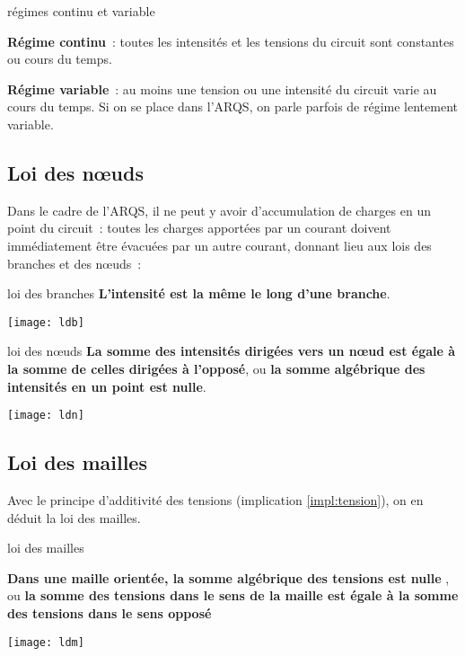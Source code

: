 \documentclass[../main/main.tex]{subfiles}
\begin{document}
\begin{defi}[label=def:regimecontvar, sidebyside]{régimes continu et variable}

    \textbf{Régime continu}~: toutes les intensités et les tensions du circuit
    sont constantes ou cours du temps.

    \tcblower

    \textbf{Régime variable}~: au moins une tension ou une intensité du circuit
    varie au cours du temps. Si on se place dans l'ARQS, on parle parfois de
    régime lentement variable.
\end{defi}

\subsection{Loi des nœuds}

Dans le cadre de l'ARQS, il ne peut y avoir d'accumulation de charges en un
point du circuit~: toutes les charges apportées par un courant doivent
immédiatement être évacuées par un autre courant, donnant lieu aux lois des
branches et des nœuds~:
\begin{loi}[label=loi:branche, sidebyside, halign upper=center]{loi des branches}
    \textbf{L'intensité est la même le long d'une branche}.
    \tcblower
    \begin{center}
        \texttt{[image: ldb]}
    \end{center}
\end{loi}
\begin{loi}[label=loi:noeud, sidebyside, halign upper=center]{loi des nœuds}
    \textbf{La somme des intensités dirigées vers un nœud est égale à la somme de
    celles dirigées à l'opposé}, ou \textbf{la somme algébrique des intensités
    en un point est nulle}.
    \tcblower
    \begin{center}
        \texttt{[image: ldn]}
    \end{center}
\end{loi}

\subsection{Loi des mailles}

Avec le principe d'additivité des tensions (implication \ref{impl:tension}), on
en déduit la loi des mailles.
\begin{loi}[label=loi:mailles, sidebyside, halign upper=center]{loi des mailles}

    \textbf{Dans une maille orientée, la somme algébrique des tensions est nulle
    }, ou \textbf{la somme des tensions dans le sens de la maille est égale à la
    somme des tensions dans le sens opposé}
    \tcblower
    \begin{center}
        \texttt{[image: ldm]}
    \end{center}
\end{loi}
\end{document}
